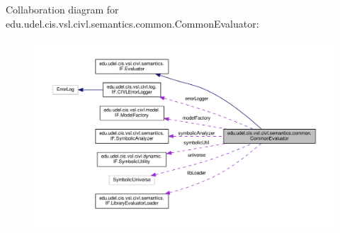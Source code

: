 Collaboration diagram for edu.\+udel.\+cis.\+vsl.\+civl.\+semantics.\+common.\+Common\+Evaluator\+:
\nopagebreak
\begin{figure}[H]
\begin{center}
\leavevmode
\includegraphics[width=350pt]{classedu_1_1udel_1_1cis_1_1vsl_1_1civl_1_1semantics_1_1common_1_1CommonEvaluator__coll__graph}
\end{center}
\end{figure}
